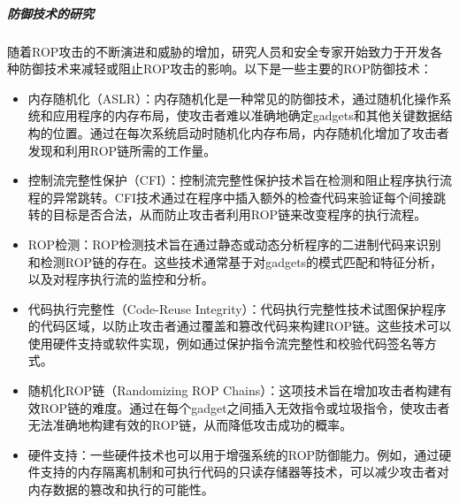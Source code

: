 \documentclass[12pt,a4paper]{ctexart}
\numberwithin{figure}{section}
\begin{document}
\subparagraph{防御技术的研究}
\par 随着ROP攻击的不断演进和威胁的增加，研究人员和安全专家开始致力于开发各种防御技术来减轻或阻止ROP攻击的影响。以下是一些主要的ROP防御技术：
\begin{itemize}
    \item 内存随机化（ASLR）：内存随机化是一种常见的防御技术，通过随机化操作系统和应用程序的内存布局，使攻击者难以准确地确定gadgets和其他关键数据结构的位置。通过在每次系统启动时随机化内存布局，内存随机化增加了攻击者发现和利用ROP链所需的工作量。
    \item 控制流完整性保护（CFI）：控制流完整性保护技术旨在检测和阻止程序执行流程的异常跳转。CFI技术通过在程序中插入额外的检查代码来验证每个间接跳转的目标是否合法，从而防止攻击者利用ROP链来改变程序的执行流程。
    \item ROP检测：ROP检测技术旨在通过静态或动态分析程序的二进制代码来识别和检测ROP链的存在。这些技术通常基于对gadgets的模式匹配和特征分析，以及对程序执行流的监控和分析。
    \item 代码执行完整性（Code-Reuse Integrity）：代码执行完整性技术试图保护程序的代码区域，以防止攻击者通过覆盖和篡改代码来构建ROP链。这些技术可以使用硬件支持或软件实现，例如通过保护指令流完整性和校验代码签名等方式。
    \item 随机化ROP链（Randomizing ROP Chains）：这项技术旨在增加攻击者构建有效ROP链的难度。通过在每个gadget之间插入无效指令或垃圾指令，使攻击者无法准确地构建有效的ROP链，从而降低攻击成功的概率。
    \item 硬件支持：一些硬件技术也可以用于增强系统的ROP防御能力。例如，通过硬件支持的内存隔离机制和可执行代码的只读存储器等技术，可以减少攻击者对内存数据的篡改和执行的可能性。
\end{itemize}
\end{document}
